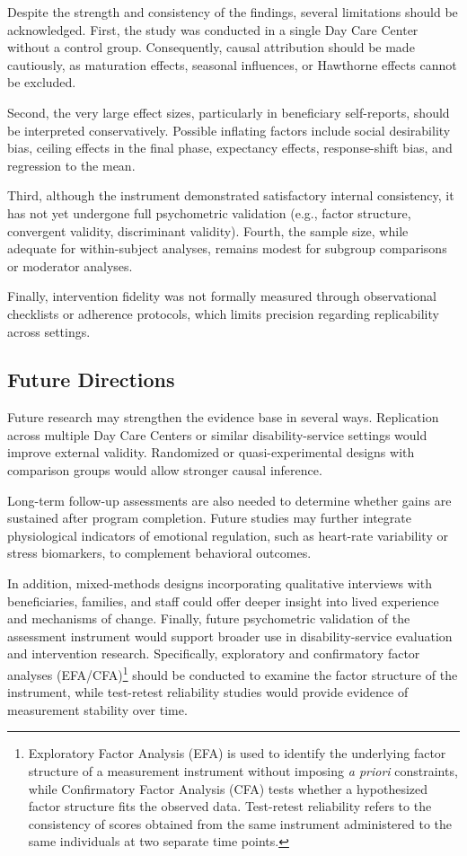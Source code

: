 \documentclass[journal]{IEEEtran}
\begin{document}
Despite the strength and consistency of the findings, several limitations should be acknowledged. First, the study was conducted in a single Day Care Center without a control group. Consequently, causal attribution should be made cautiously, as maturation effects, seasonal influences, or Hawthorne effects cannot be excluded.

Second, the very large effect sizes, particularly in beneficiary self-reports, should be interpreted conservatively. Possible inflating factors include social desirability bias, ceiling effects in the final phase, expectancy effects, response-shift bias, and regression to the mean.

Third, although the instrument demonstrated satisfactory internal consistency, it has not yet undergone full psychometric validation (e.g., factor structure, convergent validity, discriminant validity). Fourth, the sample size, while adequate for within-subject analyses, remains modest for subgroup comparisons or moderator analyses.

Finally, intervention fidelity was not formally measured through observational checklists or adherence protocols, which limits precision regarding replicability across settings.

\subsection{Future Directions}

Future research may strengthen the evidence base in several ways. Replication across multiple Day Care Centers or similar disability-service settings would improve external validity. Randomized or quasi-experimental designs with comparison groups would allow stronger causal inference.

Long-term follow-up assessments are also needed to determine whether gains are sustained after program completion. Future studies may further integrate physiological indicators of emotional regulation, such as heart-rate variability or stress biomarkers, to complement behavioral outcomes.

In addition, mixed-methods designs incorporating qualitative interviews with beneficiaries, families, and staff could offer deeper insight into lived experience and mechanisms of change. Finally, future psychometric validation of the assessment instrument would support broader use in disability-service evaluation and intervention research. Specifically, exploratory and confirmatory factor analyses (EFA/CFA)\footnote{Exploratory Factor Analysis (EFA) is used to identify the underlying factor structure of a measurement instrument without imposing \textit{a priori} constraints, while Confirmatory Factor Analysis (CFA) tests whether a hypothesized factor structure fits the observed data. Test-retest reliability refers to the consistency of scores obtained from the same instrument administered to the same individuals at two separate time points.} should be conducted to examine the factor structure of the instrument, while test-retest reliability studies would provide evidence of measurement stability over time.
\end{document}
